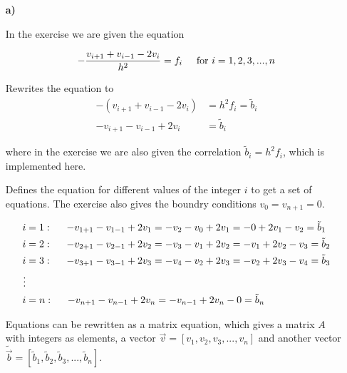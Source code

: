 \documentclass{article}
\newcounter{excount}
\newenvironment{exercise}[1][]{\addtocounter{excount}{1} \noindent {\bf Exercise
\arabic{excount} \ \ #1}\hspace{2mm}}{\vspace{4mm}}
\begin{document}
\begin{exercise}

\begin{itemize}
    \item[ \bf a)]

        In the exercise we are given the equation

        \begin{equation*}
            - \frac{v_{i+1} + v_{i-1} - 2 v_i}{h^2} = f_i \hspace{5mm} \textrm{for} ~  i = 1, 2, 3, ... , n
        \end{equation*}

        Rewrites the equation to
        \begin{align*}
            - (v_{i+1} + v_{i-1} - 2 v_i) &= h^2 f_i = \tilde{b}_i \\
            - v_{i+1} - v_{i-1} + 2 v_i &= \tilde{b}_i
        \end{align*}

        where in the exercise we are also given the correlation $\tilde{b}_i = h^2 f_i$, which is implemented here.

        Defines the equation for different values of the integer $i$ to get a set of equations. The exercise also gives the boundry conditions $v_0 = v_{n+1} = 0$.

        \begin{align*}
            i &= 1 : \hspace{5mm} - v_{1+1} - v_{1-1} + 2 v_1 = - v_2 - v_0 + 2 v_1 = - 0 + 2 v_1 - v_2 = \tilde{b}_1 \\
            i &= 2 : \hspace{5mm} - v_{2+1} - v_{2-1} + 2 v_2 = - v_3 - v_1 + 2 v_2 = - v_1 + 2 v_2 - v_3 = \tilde{b}_2 \\
            i &= 3 : \hspace{5mm} - v_{3+1} - v_{3-1} + 2 v_3 = - v_4 - v_2 + 2 v_3 = - v_2 + 2 v_3 - v_4 = \tilde{b}_3 \\
            \vdots \\
            i &= n : \hspace{5mm} - v_{n+1} - v_{n-1} + 2 v_n = - v_{n-1} + 2 v_n - 0 = \tilde{b}_n \\
        \end{align*}

        Equations can be rewritten as a matrix equation, which gives a matrix $A$ with integers as elements, a vector $\vec{v} = [v_1, v_2, v_3, ... , v_n]$ and another vector $\tilde{\vec{b}} = [\tilde{b}_1, \tilde{b}_2, \tilde{b}_3, ... , \tilde{b}_n]$.


\end{itemize}
\end{exercise}
\end{document}
